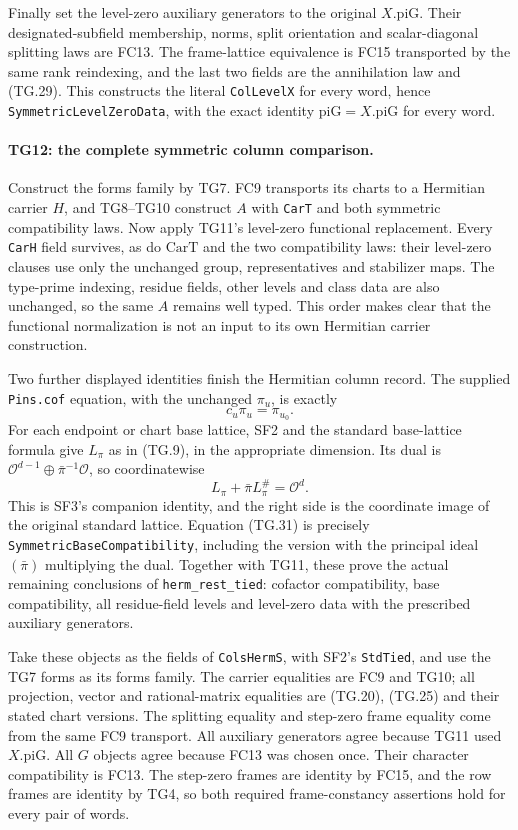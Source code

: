 \documentclass[11pt,a4paper]{article}
\numberwithin{equation}{section}
\theoremstyle{remark}\newtheorem{remark}[theorem]{Remark}
\begin{document}
Finally set the level-zero auxiliary generators to the original
$X.\mathrm{piG}$. Their designated-subfield membership, norms,
split orientation and scalar-diagonal splitting laws are FC13.
The frame-lattice equivalence is FC15 transported by the same
rank reindexing, and the last two fields are the annihilation
law and (TG.29). This constructs the literal \texttt{ColLevelX}
for every word, hence \texttt{SymmetricLevelZeroData}, with
the exact identity $\mathrm{piG}=X.\mathrm{piG}$ for every word.

\paragraph{TG12: the complete symmetric column comparison.}
Construct the forms family by TG7. FC9 transports its charts to
a Hermitian carrier $H$, and TG8--TG10 construct $A$ with
\texttt{CarT} and both symmetric compatibility laws. Now apply
TG11's level-zero functional replacement. Every \texttt{CarH}
field survives, as do $\mathrm{CarT}$ and the two compatibility
laws: their level-zero clauses use only the unchanged group,
representatives and stabilizer maps. The type-prime indexing,
residue fields, other levels and class data are also unchanged,
so the same $A$ remains well typed. This order makes clear that
the functional normalization is not an input to its own
Hermitian carrier construction.

Two further displayed identities finish the Hermitian column
record. The supplied \texttt{Pins.cof} equation, with the
unchanged $\pi_u$, is exactly
\[
                 c_u\pi_u=\pi_{u_0}.
 \tag{TG.30}
\]
For each endpoint or chart base lattice, SF2 and the standard
base-lattice formula give $L_\pi$ as in (TG.9), in the
appropriate dimension. Its dual is
$\mathcal O^{d-1}\oplus\bar\pi^{-1}\mathcal O$, so
coordinatewise
\[
               L_\pi+\bar\pi L_\pi^{\#}=\mathcal O^d.
 \tag{TG.31}
\]
This is SF3's companion identity, and the right side is the
coordinate image of the original standard lattice. Equation
(TG.31) is precisely \texttt{SymmetricBaseCompatibility},
including the version with the principal ideal
$(\bar\pi)$ multiplying the dual. Together with TG11, these
prove the actual remaining conclusions of
\texttt{herm\_\allowbreak rest\_\allowbreak tied}: cofactor compatibility, base
compatibility, all residue-field levels and level-zero data
with the prescribed auxiliary generators.

Take these objects as the fields of \texttt{ColsHermS}, with
SF2's \texttt{StdTied}, and use the TG7 forms as its forms
family. The carrier equalities are FC9 and TG10; all projection,
vector and rational-matrix equalities are (TG.20), (TG.25) and
their stated chart versions. The splitting equality and
step-zero frame equality come from the same FC9 transport.
All auxiliary generators agree because TG11 used
$X.\mathrm{piG}$. All $G$ objects agree because FC13 was chosen
once. Their character compatibility is FC13. The step-zero
frames are identity by FC15, and the row frames are identity
by TG4, so both required frame-constancy assertions hold for
every pair of words.
\end{document}
